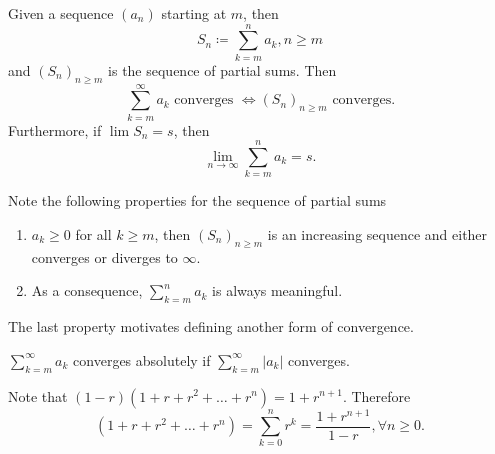 \documentclass[../notes.tex]{subfiles}
\begin{document}

\begin{definition}[Summation]
    Given a sequence $(a_n)$ starting at $m$, then
    \[
        S_n \coloneq \sum_{k = m}^{n} a_k, n \geq m
    \]
    and $(S_n)_{n \geq m}$ is the sequence of partial sums. Then
    \[
        \sum_{k = m}^\infty a_k \text{ converges } \Leftrightarrow (S_n)_{n \geq m} \text{ converges.}
    \]
    Furthermore, if $\lim S_n = s$, then
    \[
        \lim_{n\to \infty} \sum_{k = m}^n a_k = s
    .\]
\end{definition}
\begin{remark}
    Note the following properties for the sequence of partial sums
    \begin{enumerate}[label=\alph*)]
        \item $a_k \geq 0$ for all $k \geq m$, then $(S_n)_{n \geq m}$ is an increasing sequence and either converges or diverges to $\infty$.
        \item As a consequence, $\displaystyle \sum_{k = m}^n a_k$ is always meaningful.
    \end{enumerate}
\end{remark}

The last property motivates defining another form of convergence.

\begin{definition}
    $\displaystyle \sum_{k = m}^\infty a_k$ converges absolutely if $\displaystyle \sum_{k=m}^\infty |a_k|$ converges.
\end{definition}

\begin{example}
    Note that $(1-r)(1 + r + r^2 + \ldots + r^n) = 1 + r^{n+1}$. Therefore
    \[
        (1 + r + r^2 + \ldots + r^n) = \sum_{k = 0}^n r^k = \frac{1 + r^{n+1}}{1-r}, \forall n \geq 0
    .\]
\end{example}
\end{document}
